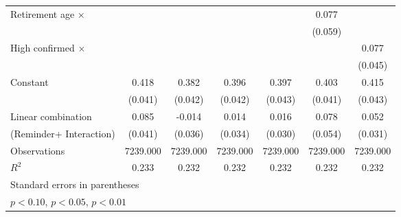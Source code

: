 {\begin{tabular}{l*{6}{c}}
\addlinespace
Retirement age $\times$&                     &                     &                     &                     &       0.077         &                     \\
                    &                     &                     &                     &                     &     (0.059)         &                     \\
\addlinespace
High confirmed $\times$&                     &                     &                     &                     &                     &       0.077\sym{*}  \\
                    &                     &                     &                     &                     &                     &     (0.045)         \\
\addlinespace
Constant            &       0.418\sym{***}&       0.382\sym{***}&       0.396\sym{***}&       0.397\sym{***}&       0.403\sym{***}&       0.415\sym{***}\\
                    &     (0.041)         &     (0.042)         &     (0.042)         &     (0.043)         &     (0.041)         &     (0.043)         \\
\midrule
Linear combination  &       0.085         &      -0.014         &       0.014         &       0.016         &       0.078         &       0.052         \\
(Reminder+ Interaction)&     (0.041)         &     (0.036)         &     (0.034)         &     (0.030)         &     (0.054)         &     (0.031)         \\
Observations        &    7239.000         &    7239.000         &    7239.000         &    7239.000         &    7239.000         &    7239.000         \\
\(R^{2}\)           &       0.233         &       0.232         &       0.232         &       0.232         &       0.232         &       0.232         \\
\bottomrule
\multicolumn{7}{l}{\footnotesize Standard errors in parentheses}\\
\multicolumn{7}{l}{\footnotesize \sym{*} \(p<0.10\), \sym{**} \(p<0.05\), \sym{***} \(p<0.01\)}\\
\end{tabular}
}
